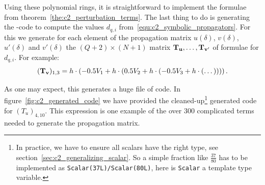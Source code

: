 Using these polynomial rings, it is straightforward to implement the formulae from theorem~\ref{the:c2_perturbation_terms}. The last thing to do is generating the \cpp{}-code to compute the values $d_{q,i}$ from~\eqref{equ:c2_symbolic_propagators}. For this we generate for each element of the propagation matrix $u(\delta)$, $v(\delta)$, $u'(\delta)$ and $v'(\delta)$ the $(Q+2)\times (N+1)$ matrix $\vb{T_u}, \dots, \vb{T_{v'}}$ of formulae for $d_{q,i}$. For example:
$$
    (\vb{T_v})_{1, 3} = h\cdot\left(-0.5 V_1 + h\cdot\left(0.5 V_2 + h\cdot\left(-0.5 V_3 + h\cdot\left(\dots\right)\right)\right)\right)\text{.}
$$

As one may expect, this generates a huge file of code. In figure~\ref{fig:c2_generated_code} we have provided the cleaned-up\footnote{In practice, we have to ensure all scalars have the right type, see section~\ref{sec:c2_generalizing_scalar}. So a simple fraction like $\frac{37}{80}$ has to be implemented as \texttt{Scalar(37L)/Scalar(80L)}, here is \texttt{Scalar} a template type variable.} generated code for $(T_u)_{4, 10}$. This expression is one example of the over $300$ complicated terms needed to generate the propagation matrix.


